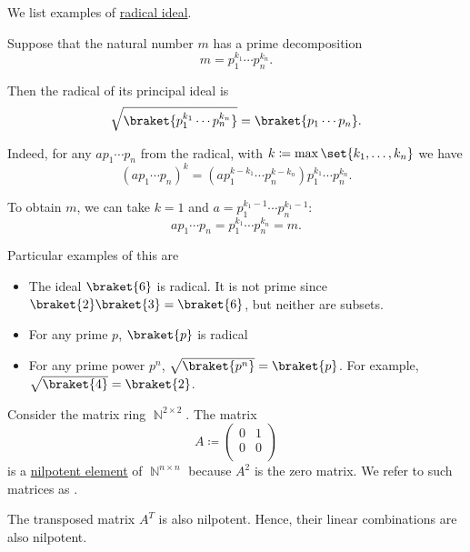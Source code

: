 \begin{example}\label{ex:def:radical_ideal}
  We list examples of \hyperref[def:radical_ideal]{radical ideal}.

  \begin{thmenum}
     Suppose that the natural number \( m \) has a prime decomposition
    \begin{equation*}
      m = p_1^{k_1} \cdots p_n^{k_n}.
    \end{equation*}

    Then the radical of its principal ideal is
    \begin{equation*}
      \sqrt{ \braket{ p_1^{k_1} \cdots p_n^{k_n} } } = \braket{ p_1 \cdots p_n }.
    \end{equation*}

    Indeed, for any \( a p_1 \cdots p_n \) from the radical, with \( k \coloneqq \max\set{ k_1, \ldots, k_n } \) we have
    \begin{equation*}
      (a p_1 \cdots p_n)^k = (a p_1^{k-k_1} \cdots p_n^{k-k_n}) p_1^{k_1} \cdots p_n^{k_n}.
    \end{equation*}

    To obtain \( m \), we can take \( k = 1 \) and \( a = p_1^{k_1-1} \cdots p_n^{k_1-1} \):
    \begin{equation*}
      a p_1 \cdots p_n = p_1^{k_1} \cdots p_n^{k_n} = m.
    \end{equation*}

    Particular examples of this are
    \begin{itemize}
      \item The ideal \( { \braket{ 6 } } \) is radical. It is not prime since \( \braket{ 2 } \braket{ 3 } = \braket{ 6 } \), but neither are subsets.

      \item For any prime \( p \), \( \braket{ p } \) is radical

      \item For any prime power \( p^n \), \( \sqrt{\braket{ p^n }} = \braket{ p } \). For example, \( \sqrt{\braket{ 4 }} = \braket{ 2 } \).
    \end{itemize}

     Consider the matrix ring \( \BbbN^{2 \times 2} \). The matrix
    \begin{equation*}
      A \coloneqq
      \begin{pmatrix}
        0 & 1 \\
        0 & 0 \\
      \end{pmatrix}
    \end{equation*}
    is a \hyperref[thm:def:semiring_ideal/properties/nilradical]{nilpotent element} of \( \BbbN^{n \times n} \) because \( A^2 \) is the zero matrix. We refer to such matrices as .

    The transposed matrix \( A^T \) is also nilpotent. Hence, their linear combinations are also nilpotent.
  \end{thmenum}
\end{example}
